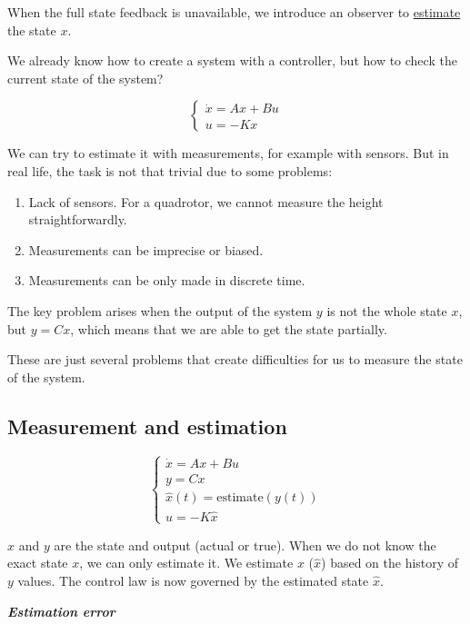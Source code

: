 When the full state feedback is unavailable, we introduce an observer to \underline{estimate} the state \(x\).


We already know how to create a system with a controller, but how to check the current state of the system?

\[
\begin{cases}
    \dot x = Ax + Bu\\
    u = -Kx
\end{cases}
\]

We can try to estimate it with measurements, for example with sensors. But in real life, the task is not that trivial due to some problems:

\begin{enumerate}
    \item Lack of sensors. For a quadrotor, we cannot measure the height straightforwardly.
    \item Measurements can be imprecise or biased.
    \item Measurements can be only made in discrete time.
\end{enumerate}

The key problem arises when the output of the system \(y\) is not the whole state \(x\), but \(y = Cx\), which means that we are able to get the state partially.

These are just several problems that create difficulties for us to measure the state of the system.

\subsection{Measurement and estimation}

\[
\begin{cases}
    \dot x = Ax + Bu \\
    y = Cx \\
    \hat x(t) = \text{estimate}(y(t)) \\
    u = -K \hat x
\end{cases}
\]

\(x\) and \(y\) are the state and output (actual or true). When we do not know the exact state \(x\), we can only estimate it. We estimate \(x\) (\(\hat x\)) based on the history of \(y\) values. The control law is now governed by the estimated state \(\hat x\).

\begin{center}
    \textit{\textbf{Estimation error}}
\end{center}

